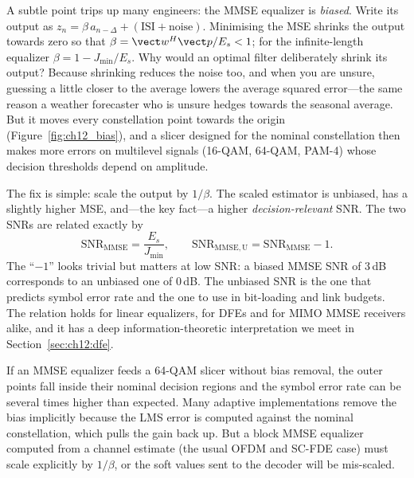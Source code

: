 A subtle point trips up many engineers: the MMSE equalizer is \emph{biased}. Write its output as
$z_n=\beta\,a_{n-\Delta}+(\text{ISI}+\text{noise})$. Minimising the MSE shrinks the output towards
zero so that $\beta=\vect w^H\vect p/E_s<1$; for the infinite-length equalizer
$\beta=1-J_{\min}/E_s$. Why would an optimal filter deliberately shrink its output? Because
shrinking reduces the noise too, and when you are unsure, guessing a little closer to the average
lowers the average squared error---the same reason a weather forecaster who is unsure hedges
towards the seasonal average. But it moves every constellation point towards the origin
(Figure~\ref{fig:ch12_bias}), and a slicer designed for the nominal constellation then makes more
errors on multilevel signals (16-QAM, 64-QAM, PAM-4) whose decision thresholds depend on amplitude.


The fix is simple: scale the output by $1/\beta$. The scaled estimator is unbiased, has a slightly
higher MSE, and---the key fact---a higher \emph{decision-relevant} SNR. The two SNRs are related
exactly by
\begin{equation}
\mathrm{SNR}_{\mathrm{MMSE}}=\frac{E_s}{J_{\min}},\qquad
\mathrm{SNR}_{\mathrm{MMSE,U}}=\mathrm{SNR}_{\mathrm{MMSE}}-1 .
\label{eq:ch12:unbiased}
\end{equation}
The ``$-1$'' looks trivial but matters at low SNR: a biased MMSE SNR of 3\,dB corresponds to an
unbiased one of 0\,dB. The unbiased SNR is the one that predicts symbol error rate and the one to
use in bit-loading and link budgets. The relation holds for linear equalizers, for DFEs and for
MIMO MMSE receivers alike, and it has a deep information-theoretic interpretation we meet in
Section~\ref{sec:ch12:dfe}.

\begin{pitfall}
If an MMSE equalizer feeds a 64-QAM slicer without bias removal, the outer points fall inside their
nominal decision regions and the symbol error rate can be several times higher than expected. Many
adaptive implementations remove the bias implicitly because the LMS error is computed against the
nominal constellation, which pulls the gain back up. But a block MMSE equalizer computed from a
channel estimate (the usual OFDM and SC-FDE case) must scale explicitly by $1/\beta$, or the soft
values sent to the decoder will be mis-scaled.
\end{pitfall}


